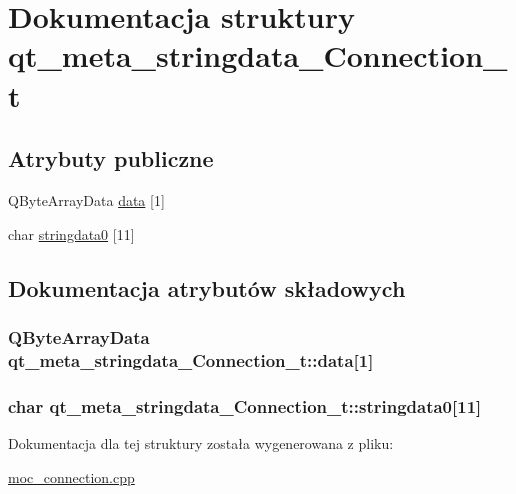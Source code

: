 \hypertarget{structqt__meta__stringdata___connection__t}{}\section{Dokumentacja struktury qt\+\_\+meta\+\_\+stringdata\+\_\+\+Connection\+\_\+t}
\label{structqt__meta__stringdata___connection__t}
\subsection*{Atrybuty publiczne}
\begin{DoxyCompactItemize}
\item 
Q\+Byte\+Array\+Data \hyperlink{structqt__meta__stringdata___connection__t_a9da136ded99b17bbb52b1529e91d2f6c}{data} \mbox{[}1\mbox{]}
\item 
char \hyperlink{structqt__meta__stringdata___connection__t_a96fe294d0ff3e28d29f4d04732b84eb8}{stringdata0} \mbox{[}11\mbox{]}
\end{DoxyCompactItemize}


\subsection{Dokumentacja atrybutów składowych}
\subsubsection[{\texorpdfstring{data}{data}}]{\setlength{\rightskip}{0pt plus 5cm}Q\+Byte\+Array\+Data qt\+\_\+meta\+\_\+stringdata\+\_\+\+Connection\+\_\+t\+::data\mbox{[}1\mbox{]}}\hypertarget{structqt__meta__stringdata___connection__t_a9da136ded99b17bbb52b1529e91d2f6c}{}\label{structqt__meta__stringdata___connection__t_a9da136ded99b17bbb52b1529e91d2f6c}
\subsubsection[{\texorpdfstring{stringdata0}{stringdata0}}]{\setlength{\rightskip}{0pt plus 5cm}char qt\+\_\+meta\+\_\+stringdata\+\_\+\+Connection\+\_\+t\+::stringdata0\mbox{[}11\mbox{]}}\hypertarget{structqt__meta__stringdata___connection__t_a96fe294d0ff3e28d29f4d04732b84eb8}{}\label{structqt__meta__stringdata___connection__t_a96fe294d0ff3e28d29f4d04732b84eb8}


Dokumentacja dla tej struktury została wygenerowana z pliku\+:\begin{DoxyCompactItemize}
\item 
\hyperlink{moc__connection_8cpp}{moc\+\_\+connection.\+cpp}\end{DoxyCompactItemize}
